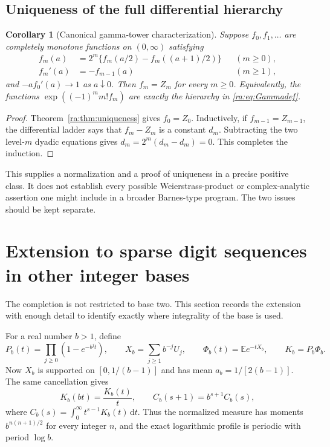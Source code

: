 \documentclass[11pt,a4paper,oneside,openany]{book}
\numberwithin{equation}{chapter}
\newtheorem{corollary}[theorem]{Corollary}
\theoremstyle{definition}
\theoremstyle{remark}
\newcommand{\E}{\mathbb E}
\newcommand{\dd}{\,\mathrm d}
\begin{document}
\section{Uniqueness of the full differential hierarchy}
\begin{corollary}[Canonical gamma-tower characterization]\label{ra:cor:towerunique}
Suppose $f_0,f_1,\ldots$ are completely monotone functions on
$(0,\infty)$ satisfying
\begin{equation}\label{ra:eq:toweraxioms}
 \begin{aligned}
 f_m(a)&=2^m\{f_m(a/2)-f_m((a+1)/2)\} &&(m\ge0),\\
 f_m'(a)&=-f_{m-1}(a) &&(m\ge1),
 \end{aligned}
\end{equation}
and $-af_0'(a)\to1$ as $a\downarrow0$.
Then $f_m=Z_m$ for every $m\ge0$. Equivalently, the functions
$\exp((-1)^m m!f_m)$ are exactly the hierarchy in
\eqref{ra:eq:Gammadef}.
\end{corollary}
\begin{proof}
Theorem~\ref{ra:thm:uniqueness} gives $f_0=Z_0$.
Inductively, if $f_{m-1}=Z_{m-1}$, the differential ladder says that
$f_m-Z_m$ is a constant $d_m$.
Subtracting the two level-$m$ dyadic equations gives
$d_m=2^m(d_m-d_m)=0$. This completes the induction.
\end{proof}

This supplies a normalization and a proof of uniqueness in a precise
positive class. It does not establish every possible Weierstrass-product
or complex-analytic assertion one might include in a broader Barnes-type
program. The two issues should be kept separate.
\chapter{Extension to sparse digit sequences in other integer bases}
\label{dc:sec:bases}
The completion is not restricted to base two. This section records
the extension with enough detail to identify exactly where
integrality of the base is used.

For a real number $b>1$, define
\begin{equation}
 P_b(t)=\prod_{j\ge0}(1-e^{-b^jt}),\qquad
 X_b=\sum_{j\ge1}b^{-j}U_j,\qquad
 \Phi_b(t)=\E e^{-tX_b},\qquad K_b=P_b\Phi_b.
 \label{dc:eq:base-products}
\end{equation}
Now $X_b$ is supported on $[0,1/(b-1)]$ and has mean
$a_b=1/[2(b-1)]$. The same cancellation gives
\begin{equation}
 K_b(bt)=\frac{K_b(t)}t,
 \qquad C_b(s+1)=b^{s+1}C_b(s),
 \label{dc:eq:base-mellin}
\end{equation}
where $C_b(s)=\int_0^\infty t^{s-1}K_b(t)\dd t$.
Thus the normalized measure has moments $b^{n(n+1)/2}$ for every
integer $n$, and the exact logarithmic profile is periodic with
period $\log b$.
\end{document}
